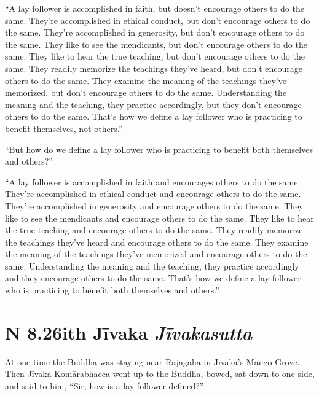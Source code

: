 \documentclass[12pt,openany]{book}%
\newcommand*{\suttatitleacronym}[1]{\smaller[2]{#1}\vspace*{.3em}}
\newcommand*{\suttatitletranslation}[1]{\linebreak{#1}}
\newcommand*{\suttatitleroot}[1]{\linebreak\smaller[2]\itshape{#1}}
\newcommand*{\tocacronym}[1]{\hspace*{-3.3em}{#1}\quad}
\newcommand*{\toctranslation}[1]{#1}
\newcommand*{\tocroot}[1]{(\textit{#1})}
\begin{document}
“A lay follower is accomplished in faith, but doesn’t encourage others to do the same. They’re accomplished in ethical conduct, but don’t encourage others to do the same. They’re accomplished in generosity, but don’t encourage others to do the same. They like to see the mendicants, but don’t encourage others to do the same. They like to hear the true teaching, but don’t encourage others to do the same. They readily memorize the teachings they’ve heard, but don’t encourage others to do the same. They examine the meaning of the teachings they’ve memorized, but don’t encourage others to do the same. Understanding the meaning and the teaching, they practice accordingly, but they don’t encourage others to do the same. That’s how we define a lay follower who is practicing to benefit themselves, not others.” 

“But how do we define a lay follower who is practicing to benefit both themselves and others?” 

“A lay follower is accomplished in faith and encourages others to do the same. They’re accomplished in ethical conduct and encourage others to do the same. They’re accomplished in generosity and encourage others to do the same. They like to see the mendicants and encourage others to do the same. They like to hear the true teaching and encourage others to do the same. They readily memorize the teachings they’ve heard and encourage others to do the same. They examine the meaning of the teachings they’ve memorized and encourage others to do the same. Understanding the meaning and the teaching, they practice accordingly and they encourage others to do the same. That’s how we define a lay follower who is practicing to benefit both themselves and others.” 

%
\section*{{\suttatitleacronym AN 8.26}{\suttatitletranslation With Jīvaka }{\suttatitleroot Jīvakasutta}}
\addcontentsline{toc}{section}{\tocacronym{AN 8.26} \toctranslation{With Jīvaka } \tocroot{Jīvakasutta}}

At one time the Buddha was staying near \textsanskrit{Rājagaha} in \textsanskrit{Jīvaka}’s Mango Grove. Then \textsanskrit{Jīvaka} \textsanskrit{Komārabhacca} went up to the Buddha, bowed, sat down to one side, and said to him, “Sir, how is a lay follower defined?” 
\end{document}
